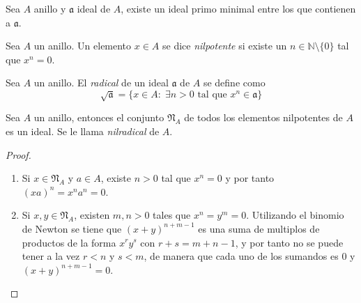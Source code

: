 \documentclass[./main.tex]{subfiles}
\begin{document}
	\begin{corollary}
		Sea $A$ anillo y $\mathfrak a$ ideal de $A$, existe un ideal primo minimal entre los que contienen a $\mathfrak a$.
	\end{corollary}
	
	\begin{definition}
		Sea $A$ un anillo. Un elemento $x\in A$ se dice \emph{nilpotente} si existe un $n\in \mathbb N \setminus \{0\}$ tal que $x^n = 0$.
	\end{definition}
	
	\begin{definition}
		Sea $A$ un anillo. El \emph{radical} de un ideal $\mathfrak a$ de $A$ se define como
		\[\sqrt {\mathfrak a} = \{x\in A: \; \exists n>0 \text{ tal que } x^n \in \mathfrak a \} \]
	\end{definition}
	
	\begin{proposition}
		Sea $A$ un anillo, entonces el conjunto $\mathfrak N_A$ de todos los elementos nilpotentes de $A$ es un ideal. Se le llama \emph{nilradical} de $A$.
	\end{proposition}
	\begin{proof}
		\begin{enumerate}
			\item Si $x \in \mathfrak{N}_A$ y $a\in A$, existe $n>0$ tal que $x^n = 0$ y por tanto $(xa)^n = x^na^n = 0$.
			\item Si $x,y \in \mathfrak N_A$, existen $m, n>0$ tales que $x^n = y^m = 0$. Utilizando el binomio de Newton se tiene que $(x+y)^{n+m-1}$ es una suma de multiplos de productos de la forma $x^ry^s$ con $r+s = m+n-1$, y por tanto no se puede tener a la vez $r<n$ y $s<m$, de manera que cada uno de los sumandos es $0$ y $(x+y)^{n+m-1}=0$.
		\end{enumerate}
	\end{proof}
	
\end{document}
